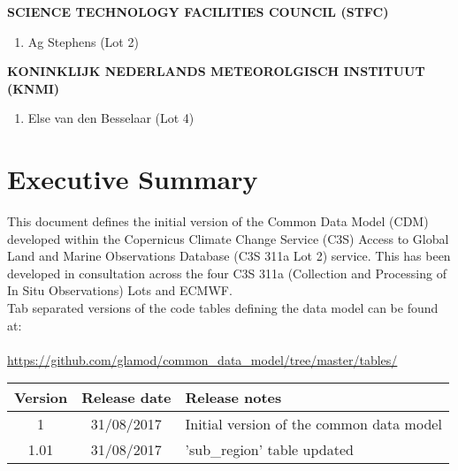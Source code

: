 \documentclass[a4paper,12pt]{article}
\begin{document}
\begin{adjustwidth}{2.cm}{}
{\fontsize{14}{17} \selectfont \textbf{\uppercase{Science Technology Facilities Council (STFC)}}}
\begin{enumerate}
\item Ag Stephens (Lot 2)\\
\end{enumerate}

{\fontsize{14}{17} \selectfont \textbf{\uppercase{Koninklijk Nederlands Meteorolgisch Instituut (KNMI)}}}
\begin{enumerate}
\item Else van den Besselaar (Lot 4)
\end{enumerate}

\end{adjustwidth}


\newpage

\section*{Executive Summary}
This document defines the initial version of the Common Data Model (CDM) developed within the Copernicus Climate Change Service (C3S) Access to Global Land and Marine Observations Database (C3S 311a Lot 2) service. This has been developed in consultation across the four C3S 311a (Collection and Processing of In Situ Observations) Lots and ECMWF.\\

Tab separated versions of the code tables defining the data model can be found at:\\ \\
\tabto{2cm} \url{https://github.com/glamod/common_data_model/tree/master/tables/}

\begin{table}[H]
\centering
\begin{tabular}{|c|c|l|}
\hline
\textbf{Version} & \textbf{Release date} & \textbf{Release notes}\\
\hline
1 & 31/08/2017 & Initial version of the common data model\\
1.01 & 31/08/2017 & 'sub\_region' table updated\\
\hline
\end{tabular}
\end{table}
\end{document}

